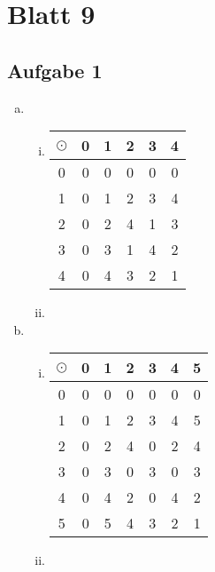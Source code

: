 \section*{Blatt 9}
%

\subsection*{Aufgabe 1}

\begin{enumerate}[a)]
  \item
  \begin{enumerate}[i)]
  \item
    \begin{tabular}{c|ccccc}
    $\odot$ & 0 & 1 & 2 & 3 & 4 \\
    \hline
    0 & 0 & 0 & 0 & 0 & 0 \\
    1 & 0 & 1 & 2 & 3 & 4 \\
    2 & 0 & 2 & 4 & 1 & 3 \\
    3 & 0 & 3 & 1 & 4 & 2 \\
    4 & 0 & 4 & 3 & 2 & 1 \\
    \end{tabular}
    \item


    \end{enumerate}




  \item
  \begin{enumerate}[i)]
  \item
  \begin{tabular}{c|cccccc}
    $\odot$ & 0 & 1 & 2 & 3 & 4 & 5\\
    \hline
    0 & 0 & 0 & 0 & 0 & 0 & 0 \\
    1 & 0 & 1 & 2 & 3 & 4 & 5 \\
    2 & 0 & 2 & 4 & 0 & 2 & 4 \\
    3 & 0 & 3 & 0 & 3 & 0 & 3 \\
    4 & 0 & 4 & 2 & 0 & 4 & 2 \\
    5 & 0 & 5 & 4 & 3 & 2 & 1 \\

    \end{tabular}

    \item


    \end{enumerate}


\end{enumerate}


